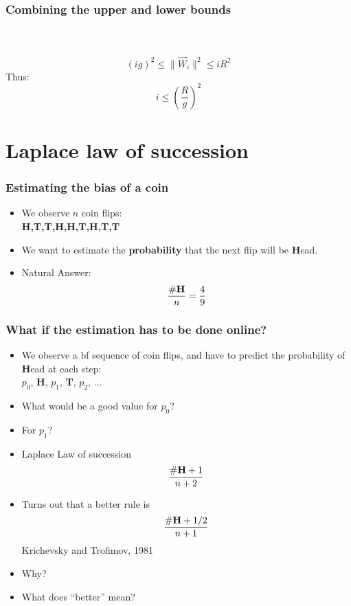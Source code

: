 \documentclass{beamer}
\newcommand{\W}{\vec{W}}
\begin{document}
\begin{frame}
\frametitle{Combining the upper and lower bounds}
~\\
~\\
\pause
$$(ig)^2 \leq \|\W_i\|^2 \leq i R^2$$
\pause
Thus:
$$ i \leq \left(\frac{R}{g} \right)^2 $$
\end{frame}

\section{Laplace law of succession}

\begin{frame}
\frametitle{Estimating the bias of a coin}

\begin{itemize}
\item We observe $n$ coin flips:\\
{\bf H,T,T,H,H,T,H,T,T}
\item
We want to estimate the {\bf probability} that the next flip will be {\bf H}ead.
\item
Natural Answer:
\[
\frac{\#\mbox{\bf H}}{n} = \frac{4}{9}
\]
\end{itemize}
\end{frame}

\begin{frame}
\frametitle{What if the estimation has to be done online?}

\begin{itemize}
\item We observe a {bf sequence} of coin flips, and have to predict the probability of {\bf H}ead at each step:
\\ $p_0$,\pause 
{\bf H},\pause 
$p_1$,\pause
{\bf T},\pause
$p_2$,\pause 
$\ldots$
\item
What would be a good value for $p_0$?
\item
For $p_1$?
\item
Laplace Law of succession
\[
\frac{\#\mbox{\bf H} +1}{n+2}
\]
\item 
Turns out that a better rule is 
\[
\frac{\#\mbox{\bf H} +1/2}{n+1}
\]
Krichevsky and Trofimov, 1981
\item
Why? 
\item 
What does ``better'' mean?
\end{itemize}
\end{frame}
\end{document}
